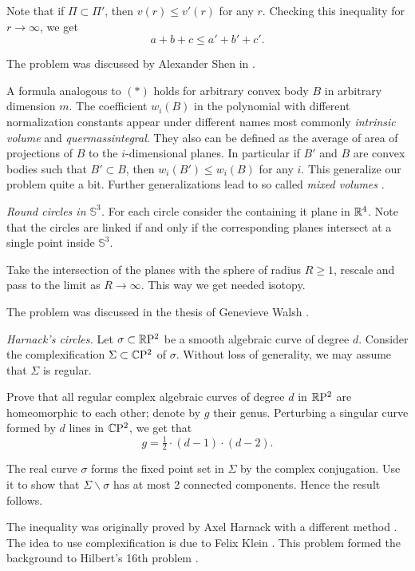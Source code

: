 Note that 
if $\Pi\subset \Pi'$,
then $v(r)\le v'(r)$ for any $r$.
Checking this inequality for $r\to\infty$,
we get 
\[a+b+c\le a'+b'+c'.\]

The problem was discussed 
by Alexander Shen in \cite{shen}.

A formula analogous to $({*})$
holds for arbitrary convex body $B$ in arbitrary dimension $m$.
The coefficient $w_i(B)$ in the polynomial with different normalization constants 
appear under different names most commonly
\emph{intrinsic volume} and
\emph{quermassintegral}.
They also can be defined as the average 
of area of projections of $B$ to the $i$-dimensional planes.
In particular 
if $B'$ and $B$ are convex bodies such that $B'\subset B$,
then $w_i(B')\le w_i(B)$ for any $i$.
This generalize our problem quite a bit.
Further generalizations lead to so called \emph{mixed volumes} \cite[see][]{burago-zalgaller}.



\textit{Round circles in $\mathbb{S}^3$.}
For each circle consider the containing it plane in $\mathbb{R}^4$.
Note that the circles are linked 
if and only if 
the corresponding planes intersect at a single point inside $\mathbb{S}^3$.

Take the intersection of the planes with the sphere of radius $R\ge 1$,
rescale and pass to the limit as $R\to\infty$.  
This way we get needed isotopy.

The problem was discussed 
in the thesis of Genevieve Walsh \cite[see][]{walsh}.

\textit{Harnack's circles.}
Let $\sigma\subset \mathbb{R}\mathrm{P}^2$ be a smooth algebraic curve of degree $d$.
Consider the complexification $\Sigma\subset \mathbb{C}\mathrm{P}^2$ of $\sigma$.
Without loss of generality, we may assume that $\Sigma$ is regular.

Prove that all regular complex algebraic curves of degree $d$ in $\mathbb{R}\mathrm{P}^2$
are homeomorphic to each other; 
denote by $g$ their genus.
Perturbing a singular curve formed by  $d$ lines in $\mathbb{C}\mathrm{P}^2$,
we get that 
\[g=\tfrac12\cdot(d-1)\cdot(d-2).\]

The real curve $\sigma$ forms the fixed point set in $\Sigma$ 
by the complex conjugation. 
Use it to show that $\Sigma\backslash\sigma$ has at most 2 connected components.
Hence the result follows.

The inequality was originally proved 
by Axel Harnack with a different method \cite[see][]{harnack}.
The idea to use complexification is due to Felix Klein \cite[see][]{klein}.
This problem formed the background to Hilbert's 16th problem \cite[see][]{hilbert-problems}. 






